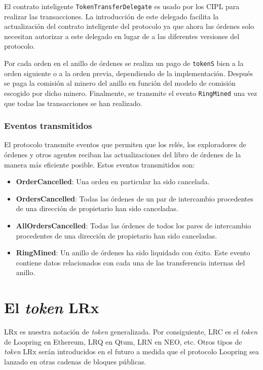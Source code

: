 \documentclass[UTF8,nofonts]{article}
\begin{document}
\begin{multicols}{2}
El contrato inteligente \verb|TokenTransferDelegate| es usado por los CIPL para realizar las transacciones. La introducción de este delegado facilita la actualización del contrato inteligente del protocolo ya que ahora las órdenes solo necesitan autorizar a este delegado en lugar de a las diferentes versiones del protocolo.

Por cada orden en el anillo de órdenes se realiza un pago de \verb|tokenS| bien a la orden siguiente o a la orden previa, dependiendo de la implementación. Después se paga la comisión al minero del anillo en función del modelo de comisión escogido por dicho minero. Finalmente, se transmite el evento \verb|RingMined| una vez que todas las transacciones se han realizado.

\subsubsection{Eventos transmitidos\label{sec:events}}

El protocolo transmite eventos que permiten que los relés, los exploradores de órdenes y otros agentes reciban las actualizaciones del libro de órdenes de la manera más eficiente posible. Estos eventos transmitidos son:

\begin{itemize}
	\item \textbf{OrderCancelled}: Una orden en particular ha sido cancelada.
	\item \textbf{OrdersCancelled}: Todas las órdenes de un par de intercambio procedentes de una dirección de propietario han sido canceladas.
	\item \textbf{AllOrdersCancelled}: Todas las órdenes de todos los pares de intercambio procedentes de una dirección de propietario han sido canceladas.
	\item \textbf{RingMined}: Un anillo de órdenes ha sido liquidado con éxito. Este evento contiene datos relacionados con cada una de las transferencia internas del anillo.
\end{itemize}


\section{El \textit{token} LRx\label{sec:token}}
LRx es nuestra notación de \textit{token} generalizada. Por consiguiente, LRC es el \textit{token} de Loopring en Ethereum, LRQ en Qtum, LRN en NEO, etc. Otros tipos de \textit{token} LRx serán introducidos en el futuro a medida que el protocolo Loopring sea lanzado en otras cadenas de bloques públicas.


\end{multicols}
\end{document}
